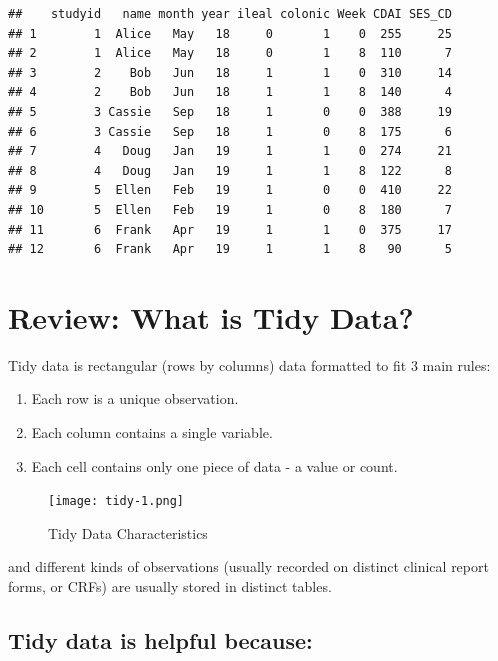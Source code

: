\documentclass[
]{book}
\providecommand{\tightlist}{%
  \setlength{\itemsep}{0pt}\setlength{\parskip}{0pt}}
\begin{document}
\begin{verbatim}
##    studyid   name month year ileal colonic Week CDAI SES_CD
## 1        1  Alice   May   18     0       1    0  255     25
## 2        1  Alice   May   18     0       1    8  110      7
## 3        2    Bob   Jun   18     1       1    0  310     14
## 4        2    Bob   Jun   18     1       1    8  140      4
## 5        3 Cassie   Sep   18     1       0    0  388     19
## 6        3 Cassie   Sep   18     1       0    8  175      6
## 7        4   Doug   Jan   19     1       1    0  274     21
## 8        4   Doug   Jan   19     1       1    8  122      8
## 9        5  Ellen   Feb   19     1       0    0  410     22
## 10       5  Ellen   Feb   19     1       0    8  180      7
## 11       6  Frank   Apr   19     1       1    0  375     17
## 12       6  Frank   Apr   19     1       1    8   90      5
\end{verbatim}

\hypertarget{review-what-is-tidy-data}{%
\section{Review: What is Tidy Data?}\label{review-what-is-tidy-data}}

Tidy data is rectangular (rows by columns) data formatted to fit 3 main rules:

\begin{enumerate}
\def\labelenumi{\arabic{enumi}.}
\tightlist
\item
  Each row is a unique observation.
\item
  Each column contains a single variable.
\item
  Each cell contains only one piece of data - a value or count.
\end{enumerate}

\begin{figure}
\centering
\texttt{[image: tidy-1.png]}
\caption{Tidy Data Characteristics}
\end{figure}

and different kinds of observations (usually recorded on distinct clinical report forms, or CRFs) are usually stored in distinct tables.

\hypertarget{tidy-data-is-helpful-because-1}{%
\subsection{Tidy data is helpful because:}\label{tidy-data-is-helpful-because-1}}
\end{document}
